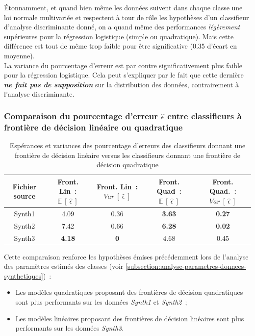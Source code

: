 \documentclass[a4paper,10pt]{report}
\begin{document}
Étonnamment, et quand bien même les données suivent dans chaque classe une loi normale multivariée et respectent à tour de rôle les hypothèses d'un classifieur d'analyse discriminante donné, on a quand même des performances \textit{légèrement} supérieures pour la régression logistique (simple ou quadratique). Mais cette différence est tout de même trop faible pour être significative (0.35 d'écart en moyenne).\\
La variance du pourcentage d'erreur est par contre significativement plus faible pour la régression logistique. Cela peut s'expliquer par le fait que cette dernière \textit{\textbf{ne fait pas de supposition}} sur la distribution des données, contrairement à l'analyse discriminante.

\subsubsection{Comparaison du pourcentage d'erreur $\hat{\epsilon}$ entre classifieurs à frontière de décision linéaire ou quadratique}
\begin{table}[H]
	\centering
	\captionsetup{justification=centering, margin=1cm}
	\begin{tabular}{c|c|c|c|c}
		Fichier source & Front. Lin~: $\mathbb{E}\ [\ \hat{\epsilon}\ ]$ & Front. Lin~: $Var\ [\ \hat{\epsilon}\ ]$ & Front. Quad~: $\mathbb{E}\ [\ \hat{\epsilon}\ ]$ & Front. Quad.~: $Var\ [\ \hat{\epsilon}\ ]$ \\ 
		\hline
		Synth1 & 4.09    & 0.36   & \textbf{3.63}   & \textbf{0.27}   \\ 
		Synth2 & 7.42   & 0.66   &  \textbf{6.28}  & \textbf{0.02}  \\ 
		Synth3 &  \textbf{4.18}  &  \textbf{0}  & 4.68   & 0.45   \\ 
	\end{tabular}
	\caption{\small Espérances et variances des pourcentage d'erreurs des classifieurs donnant une frontière de décision linéaire versus les classifieurs donnant une frontière de décision quadratique}
	\label{table:2-1-erreur-data-synth-mean-var-lin-vs-quad}
\end{table}

Cette comparaison renforce les hypothèses émises précédemment lors de l'analyse des paramètres estimés des classes (voir \autoref{subsection:analyse-parametres-donnees-synthetiques})~:
\begin{itemize}
	\item Les modèles quadratiques proposant des frontières de décision quadratiques sont plus performants sur les données \textit{Synth1} et \textit{Synth2}~;
	\item Les modèles linéaires proposant des frontières de décision linéaires sont plus performants sur les données \textit{Synth3}.
\end{itemize}
\end{document}
